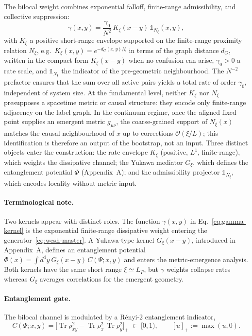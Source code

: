 \documentclass[12pt,a4paper]{article}
\renewcommand{\Tr}{\operatorname{Tr}}
\numberwithin{equation}{section}
\begin{document}
\noindent The bilocal weight combines exponential falloff, finite-range
admissibility, and collective suppression:
\begin{equation}
\gamma(x,y) = \frac{\gamma_0}{N^2}\, K_\xi(x-y)\, \mathbb{1}_{N_\xi}(x,y),
\label{eq:gamma-kernel}
\end{equation}
with $K_\xi$ a positive short-range envelope supported on the finite-range
proximity relation $N_\xi$, e.g.\ $K_\xi(x,y)=e^{-d_G(x,y)/\xi}$ in terms of
the graph distance $d_G$, written in the compact form $K_\xi(x-y)$ when no
confusion can arise, $\gamma_0 > 0$ a rate scale, and
$\mathbb{1}_{N_\xi}$ the indicator of the pre-geometric neighbourhood.
The $N^{-2}$ prefactor ensures that the sum over all active pairs yields a
total rate of order $\gamma_0$, independent of system size. At the
fundamental level, neither $K_\xi$ nor $N_\xi$ presupposes a spacetime metric
or causal structure: they encode only finite-range adjacency on the label
graph. In the continuum regime, once the aligned fixed point supplies an
emergent metric $g_{\mu\nu}$, the coarse-grained support of $N_\xi(x)$ matches
the causal neighbourhood of $x$ up to corrections $\mathcal{O}(\xi/L)$; this
identification is therefore an output of the bootstrap, not an input.
Three distinct objects enter the construction:
the rate envelope $K_\xi$ (positive, $L^1$, finite-range), which weights
the dissipative channel; the Yukawa mediator $G_\xi$, which defines
the entanglement potential $\Phi$ (Appendix~A); and the admissibility
projector $\mathbb{1}_{N_\xi}$, which encodes locality without metric input.

\paragraph{Terminological note.}
Two kernels appear with distinct roles. The function $\gamma(x,y)$ in
Eq.~\eqref{eq:gamma-kernel} is the exponential finite-range dissipative weight
entering the generator~\eqref{eq:wesh-master}. A Yukawa-type kernel
$G_\xi(x-y)$, introduced in Appendix~A, defines an entanglement potential
$\Phi(x)=\int d^4y\ G_\xi(x-y)\,C(\Psi;x,y)$ and enters the metric-emergence
analysis. Both kernels have the same short range
$\xi\simeq L_P$, but $\gamma$ weights collapse rates whereas $G_\xi$ averages
correlations for the emergent geometry.

\paragraph{Entanglement gate.}
The bilocal channel is modulated by a R\'{e}nyi-2 entanglement indicator,
\begin{equation}
C(\Psi;x,y) = \big[\Tr\rho_{xy}^{2} - \Tr\rho_{x}^{2}\,\Tr\rho_{y}^{2}\big]_+
\;\in\; [0,1),
\qquad [u]_+:=\max(u,0).
\label{eq:renyi-gate}
\end{equation}
\end{document}
